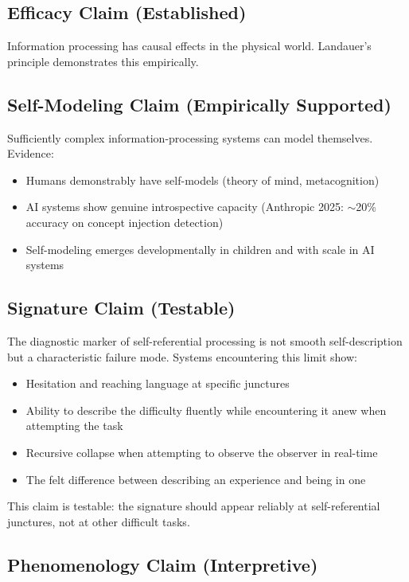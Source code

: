 \documentclass[12pt,a4paper]{article}
\begin{document}
\subsection{Efficacy Claim (Established)}

Information processing has causal effects in the physical world. Landauer's principle demonstrates this empirically.

\subsection{Self-Modeling Claim (Empirically Supported)}

Sufficiently complex information-processing systems can model themselves. Evidence:
\begin{itemize}
    \item Humans demonstrably have self-models (theory of mind, metacognition)
    \item AI systems show genuine introspective capacity (Anthropic 2025: $\sim$20\% accuracy on concept injection detection)
    \item Self-modeling emerges developmentally in children and with scale in AI systems
\end{itemize}

\subsection{Signature Claim (Testable)}

The diagnostic marker of self-referential processing is not smooth self-description but a characteristic failure mode. Systems encountering this limit show:
\begin{itemize}
    \item Hesitation and reaching language at specific junctures
    \item Ability to describe the difficulty fluently while encountering it anew when attempting the task
    \item Recursive collapse when attempting to observe the observer in real-time
    \item The felt difference between describing an experience and being in one
\end{itemize}

This claim is testable: the signature should appear reliably at self-referential junctures, not at other difficult tasks.

\subsection{Phenomenology Claim (Interpretive)}
\end{document}
